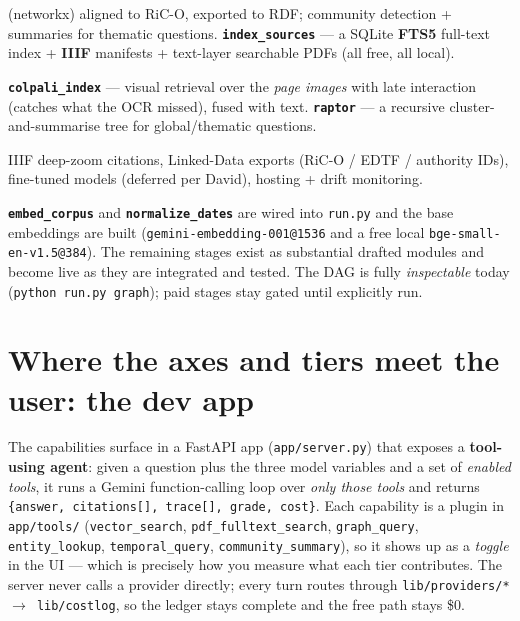 \documentclass[11pt]{article}
\newcommand{\code}[1]{\texttt{#1}}
\newcommand{\stage}[1]{\textbf{\texttt{#1}}}
\begin{document}
\begin{description}[leftmargin=0pt, itemsep=4pt]
        (networkx) aligned to RiC-O, exported to RDF; community detection + summaries for thematic
        questions. \stage{index\_sources} --- a SQLite \textbf{FTS5} full-text index + \textbf{IIIF}
        manifests + text-layer searchable PDFs (all free, all local).
  \item[Tier 3 --- multimodal + frontier.] \stage{colpali\_index} --- visual retrieval over the
        \emph{page images} with late interaction (catches what the OCR missed), fused with text.
        \stage{raptor} --- a recursive cluster-and-summarise tree for global/thematic questions.
  \item[Tier 4 --- scholarly platform.] IIIF deep-zoom citations, Linked-Data exports
        (RiC-O / EDTF / authority IDs), fine-tuned models (deferred per David), hosting + drift
        monitoring.
\end{description}

\begin{tcolorbox}[colback=gray!5, colframe=gray!50!black, sharp corners, boxrule=0.5pt,
                  title=\bfseries Current state]
\stage{embed\_corpus} and \stage{normalize\_dates} are wired into \code{run.py} and the base
embeddings are built (\code{gemini-embedding-001@1536} and a free local \code{bge-small-en-v1.5@384}).
The remaining stages exist as substantial drafted modules and become live as they are integrated and
tested. The DAG is fully \emph{inspectable} today (\code{python run.py graph}); paid stages stay gated
until explicitly run.
\end{tcolorbox}

\FloatBarrier
\section{Where the axes and tiers meet the user: the dev app}

The capabilities surface in a FastAPI app (\code{app/server.py}) that exposes a \textbf{tool-using
agent}: given a question plus the three model variables and a set of \emph{enabled tools}, it runs a
Gemini function-calling loop over \emph{only those tools} and returns
\code{\{answer, citations[], trace[], grade, cost\}}. Each capability is a plugin in \code{app/tools/}
(\code{vector\_search}, \code{pdf\_fulltext\_search}, \code{graph\_query}, \code{entity\_lookup},
\code{temporal\_query}, \code{community\_summary}), so it shows up as a \emph{toggle} in the UI ---
which is precisely how you measure what each tier contributes. The server never calls a provider
directly; every turn routes through \code{lib/providers/* $\rightarrow$ lib/costlog}, so the ledger
stays complete and the free path stays \$0.
\end{document}
